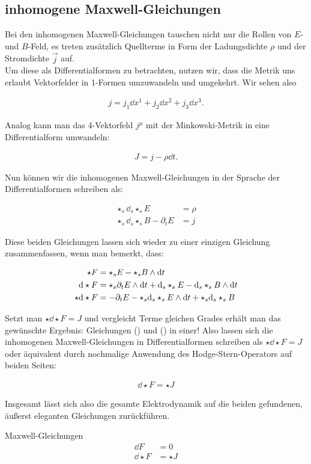 \subsection{inhomogene Maxwell-Gleichungen}

Bei den inhomogenen Maxwell-Gleichungen tauschen nicht nur die Rollen von $E$- und $B$-Feld, es treten zusätzlich Quellterme in Form der Ladungsdichte $\rho$ und der Stromdichte $\vec{j}$ auf. \\
Um diese als Differentialformen zu betrachten, nutzen wir, dass die Metrik uns erlaubt Vektorfelder in 1-Formen umzuwandeln und umgekehrt. Wir sehen also  

\begin{align}
j = j_1 \dd x^1 + j_2 \dd x^2 + j_3 \dd x^3. 
\end{align}

Analog kann man das 4-Vektorfeld $j^{\mu}$ mit der Minkowski-Metrik in eine Differentialform umwandeln:

\begin{align}
J = j - \rho \dd t. 
\end{align}

Nun können wir die inhomogenen Maxwell-Gleichungen in der Sprache der Differentialformen schreiben als:

\begin{align}
\star_s \dd_s \star_s E &= \rho \\
\star_s \dd_s \star_s B - \partial_t E &= j
\end{align}

Diese beiden Gleichungen lassen sich wieder zu einer einzigen Gleichung zusammenfassen, wenn man bemerkt, dass:

\begin{align}
\star F &= \star_s E - \star_s B \wedge \dd t \\
\dd \star F &= \star_s \partial_t E  \wedge \dd t + \dd_s \star_s E - \dd_s \star_s B \wedge \dd t \\
\star \dd \star F &= - \partial_t E - \star_s \dd_s \star_s E \wedge \dd t + \star_s \dd_s \star_s B 		
\end{align}

Setzt man $\star \dd \star F = J$ und vergleicht Terme gleichen Grades erhält man das gewünschte Ergebnis: Gleichungen () und () in einer! Also lassen sich die inhomogenen Maxwell-Gleichungen in Differentialformen schreiben als $\star \dd \star F = J$ oder äquivalent durch nochmalige Anwendung des Hodge-Stern-Operators auf beiden Seiten:

\begin{align}
\dd \star F = \star J		
\end{align}


Insgesamt lässt sich also die gesamte Elektrodynamik auf die beiden gefundenen, äußerst eleganten Gleichungen zurückführen.

\begin{mybox}{Maxwell-Gleichungen}
\begin{align*}
\dd F &= 0 \\
\dd \star F &= \star J
\end{align*}
\end{mybox}
